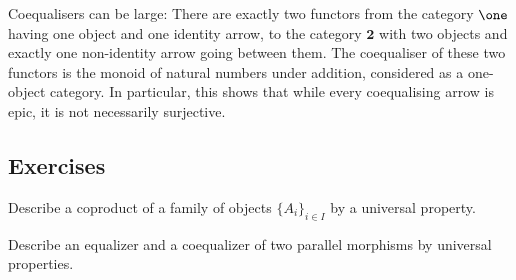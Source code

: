   \begin{exam}
    Coequalisers can be large: There are exactly two functors from the category $\one$ having one object and one identity arrow, to the category $\mathbf{2}$ with two objects and exactly one non-identity arrow going between them. The coequaliser of these two functors is the monoid of natural numbers under addition, considered as a one-object category. In particular, this shows that while every coequalising arrow is epic, it is not necessarily surjective.
  \end{exam}

\subsection{Exercises}
  \begin{ex}
    Describe a coproduct of a family of objects $\{A_i\}_{i\in I}$ by a universal property.
  \end{ex}
  \begin{ex}
    Describe an equalizer and a coequalizer of two parallel morphisms by universal properties.
  \end{ex}

